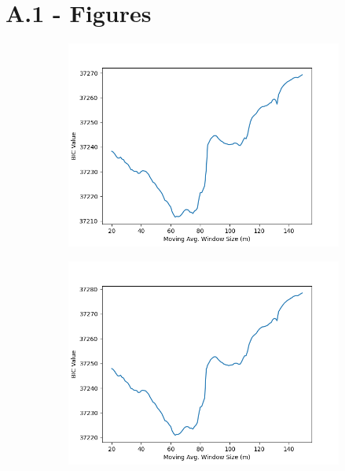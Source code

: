 \documentclass[12pt]{article}
\begin{document}
\section*{A.1 - Figures}
\graphicspath{{BICPlots/}}
\begin{figure}[!ht]
  \centering
  \scriptsize
  \setlength{\abovecaptionskip}{1pt}
  \setlength{\belowcaptionskip}{1pt}
  \captionsetup{font=scriptsize}
  
  \caption[BIC Plots]{This figure shows the Bayesian Information Criterion (BIC) against moving‑average window size \(m\) for all MF2‑GARCH‑in‑mean specifications. Left column: proportional variants, right column: non‑proportional. The rows from top to bottom show: short‑term component, long‑term component, two-component, and overall conditional variance specifications.}
\begin{subfigure}[!ht]{0.45\textwidth}
\includegraphics[width=\linewidth]{Prop_ST_Cr}
\end{subfigure}\hfill
\begin{subfigure}[!ht]{0.45\textwidth}
    \includegraphics[width=\linewidth]{ST_Cr}
  \end{subfigure}


\end{figure}
\end{document}
